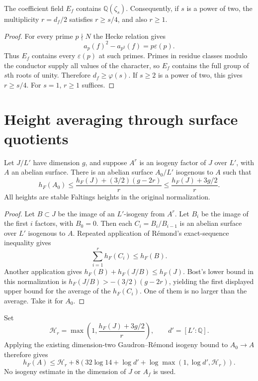 \begin{lemma}
The coefficient field $E_f$ contains $\mathbb Q(\zeta_s)$.
Consequently, if $s$ is a power of two, the multiplicity $r=d_f/2$
satisfies $r\ge s/4$, and also $r\ge1$.
\end{lemma}
\begin{proof}
For every prime $p\nmid N$ the Hecke relation gives
\[
               a_p(f)^2-a_{p^2}(f)=p\varepsilon(p).
\]
Thus $E_f$ contains every $\varepsilon(p)$ at such primes.
Primes in residue classes modulo the conductor supply all values
of the character, so $E_f$ contains the full group of $s$th roots
of unity. Therefore $d_f\ge\varphi(s)$. If $s\ge2$ is a power
of two, this gives $r\ge s/4$. For $s=1$, $r\ge1$ suffices.
\end{proof}

\section{Height averaging through surface quotients}

\begin{lemma}
Let $J/L'$ have dimension $g$, and suppose $A^r$ is an isogeny
factor of $J$ over $L'$, with $A$ an abelian surface. There is an
abelian surface $A_0/L'$ isogenous to $A$ such that
\[
 h_F(A_0)\le
          \frac{h_F(J)+(3/2)(g-2r)}{r}
       \le\frac{h_F(J)+3g/2}{r}.
\]
All heights are stable Faltings heights in the original normalization.
\end{lemma}
\begin{proof}
Let $B\subset J$ be the image of an $L'$-isogeny from $A^r$.
Let $B_i$ be the image of the first $i$ factors, with $B_0=0$.
Then each $C_i=B_i/B_{i-1}$ is an abelian surface over $L'$
isogenous to $A$. Repeated application of Rémond's exact-sequence
inequality gives
\[
                  \sum_{i=1}^r h_F(C_i)\le h_F(B).
\]
Another application gives
$h_F(B)+h_F(J/B)\le h_F(J)$.
Bost's lower bound in this normalization is
$h_F(J/B)>-(3/2)(g-2r)$, yielding the first displayed upper
bound for the average of the $h_F(C_i)$. One of them is no
larger than the average. Take it for $A_0$.
\end{proof}

Set
\[
 \mathcal H_r=\max\left(1,\frac{h_F(J)+3g/2}{r}\right),
 \qquad d'=[L':\mathbb Q].
\]
Applying the existing dimension-two Gaudron--Rémond isogeny
bound to $A_0\to A$ therefore gives
\[
 h_F(A)\le \mathcal H_r+
 8\left(32\log14+\log d'
                   +\log\max(1,\log d',\mathcal H_r)\right).
\]
No isogeny estimate in the dimension of $J$ or $A_f$ is used.


